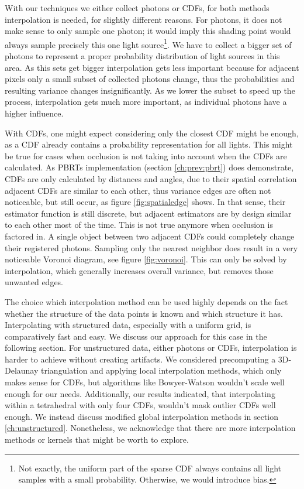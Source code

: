 With our techniques we either collect photons or CDFs, for both methods interpolation is needed, for slightly different reasons. For photons, it does not make sense to only sample one photon; it would imply this shading point would always sample precisely this one light source\footnote{Not exactly, the uniform part of the sparse CDF always contains all light samples with a small probability. Otherwise, we would introduce bias.}. We have to collect a bigger set of photons to represent a proper probability distribution of light sources in this area. As this sets get bigger interpolation gets less important because for adjacent pixels only a small subset of collected photons change, thus the probabilities and resulting variance changes insignificantly. As we lower the subset to speed up the process, interpolation gets much more important, as individual photons have a higher influence.

With CDFs, one might expect considering only the closest CDF might be enough, as a CDF already contains a probability representation for all lights. This might be true for cases when occlusion is not taking into account when the CDFs are calculated. As PBRTs implementation (section \ref{ch:prev:pbrt}) does demonstrate, CDFs are only calculated by distances and angles, due to their spatial correlation adjacent CDFs are similar to each other, thus variance edges are often not noticeable, but still occur, as figure \ref{fig:spatialedge} shows. In that sense, their estimator function is still discrete, but adjacent estimators are by design similar to each other most of the time. This is not true anymore when occlusion is factored in. A single object between two adjacent CDFs could completely change their registered photons. Sampling only the nearest neighbor does result in a very noticeable Voronoi diagram, see figure \ref{fig:voronoi}. This can only be solved by interpolation, which generally increases overall variance, but removes those unwanted edges.

The choice which interpolation method can be used highly depends on the fact whether the structure of the data points is known and which structure it has. Interpolating with structured data, especially with a uniform grid, is comparatively fast and easy. We discuss our approach for this case in the following section. For unstructured data, either photons or CDFs, interpolation is harder to achieve without creating artifacts. We considered precomputing a 3D-Delaunay triangulation and applying local interpolation methods, which only makes sense for CDFs, but algorithms like Bowyer-Watson wouldn't scale well enough for our needs. Additionally, our results indicated, that interpolating within a tetrahedral with only four CDFs, wouldn't mask outlier CDFs well enough. We instead discuss modified global interpolation methods in section \ref{ch:unstructured}. Nonetheless, we acknowledge that there are more interpolation methods or kernels that might be worth to explore.


